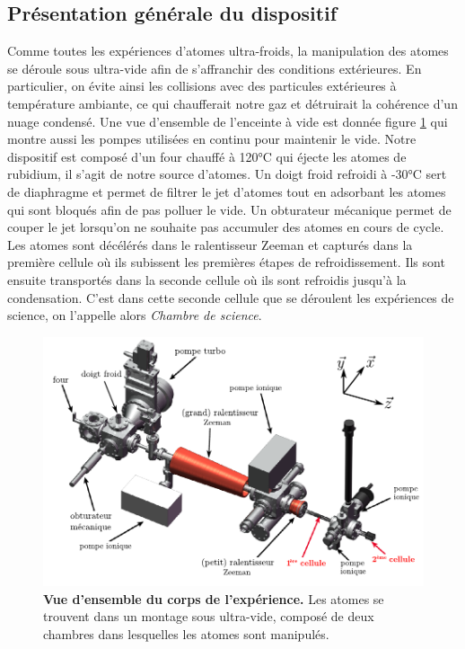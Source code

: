 \subsection{Présentation générale du dispositif}
Comme toutes les expériences d'atomes ultra-froids, la manipulation des atomes se déroule sous ultra-vide afin de s'affranchir des conditions extérieures. En particulier, on évite ainsi les collisions avec des particules extérieures à température ambiante, ce qui chaufferait notre gaz et détruirait la cohérence d'un nuage condensé. Une vue d'ensemble de l'enceinte à vide est donnée figure \ref{fig:manip} qui montre aussi les pompes utilisées en continu pour maintenir le vide. Notre dispositif est composé d'un four chauffé à 120°C qui éjecte les atomes de rubidium, il s'agit de notre source d'atomes. Un doigt froid refroidi à -30°C sert de diaphragme et permet de filtrer le jet d'atomes tout en adsorbant les atomes qui sont bloqués afin de pas polluer le vide. Un obturateur mécanique permet de couper le jet lorsqu'on ne souhaite pas accumuler des atomes en cours de cycle. Les atomes sont décélérés dans le ralentisseur Zeeman et capturés dans la première cellule où ils subissent les premières étapes de refroidissement. Ils sont ensuite transportés dans la seconde cellule où ils sont refroidis jusqu'à la condensation. C'est dans cette seconde cellule que se déroulent les expériences de science, on l'appelle alors \emph{Chambre de science}.

\begin{figure}
\centering
\includegraphics[width=\textwidth]{Fig/BEC_manip/manip.pdf}
\caption{\textbf{Vue d'ensemble du corps de l'expérience.} Les atomes se trouvent dans un montage sous ultra-vide, composé de deux chambres dans lesquelles les atomes sont manipulés.}
\label{fig:manip}
\end{figure}

